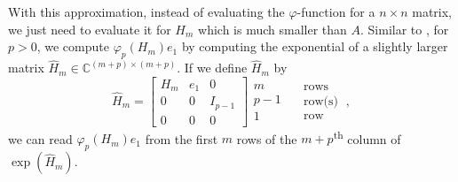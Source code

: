 With this approximation, instead of evaluating the $\varphi$-function for a $n \times n$ matrix,
we just need to evaluate it for $H_m$ which is much smaller than $A$. Similar to \cite{niesen2012},
for $p > 0$, we compute $\varphi_p(H_m) e_1$ by computing the exponential of a slightly larger matrix
$\hat{H}_m \in \mathbb{C}^{(m+p) \times (m+p)}$. If we define $\hat{H}_m$ by
\begin{equation}
    \hat{H}_m =
    \begin{bmatrix}
        H_m & e_1 & 0       \\
        0   & 0   & I_{p-1} \\
        0   & 0   & 0
    \end{bmatrix}
    \begin{matrix} m \\ p-1 \\ 1 \end{matrix}
    \begin{matrix} \quad \text{rows} \\ \quad \text{row(s)} \\ \quad \text{row} \end{matrix}
    \: ,
\end{equation}
we can read $\varphi_p(H_m) e_1$ from the first $m$ rows of the $m+p$\textsuperscript{th} column
of $\exp(\hat{H}_m)$.

